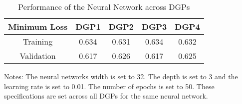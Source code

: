 

\begin{table}[ht]
\centering
\begin{threeparttable}
\caption{Performance of the Neural Network across DGPs}
\label{tab:table3}
\begin{tabular}{ccccc} %
\toprule
\hline
\addlinespace
Minimum Loss  & DGP1 & DGP2 & DGP3 & DGP4 \\ \midrule
Training   & 0.634 & 0.631 & 0.634 & 0.632 \\
Validation  & 0.617 & 0.626 & 0.617 & 0.625 \\ \bottomrule
\end{tabular}
\begin{tablenotes}
    \item Notes: The neural networks width is set to 32. The depth is set to 3 and the learning rate is set to 0.01. The number of epochs is set to 50. These specifications are set across all DGPs for the same neural network.
\end{tablenotes}
\end{threeparttable}
\end{table}
